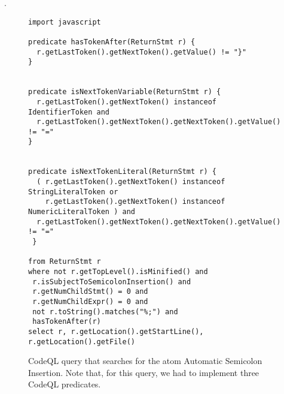 .

\begin{figure}[htb]
\begin{lstlisting}[language=CodeQL, basicstyle=\scriptsize]
import javascript

predicate hasTokenAfter(ReturnStmt r) {
  r.getLastToken().getNextToken().getValue() != "}"
}


predicate isNextTokenVariable(ReturnStmt r) {
  r.getLastToken().getNextToken() instanceof IdentifierToken and 
  r.getLastToken().getNextToken().getNextToken().getValue() != "="
}


predicate isNextTokenLiteral(ReturnStmt r) {
  ( r.getLastToken().getNextToken() instanceof StringLiteralToken or
    r.getLastToken().getNextToken() instanceof NumericLiteralToken ) and 
  r.getLastToken().getNextToken().getNextToken().getValue() != "="
 }

from ReturnStmt r
where not r.getTopLevel().isMinified() and
 r.isSubjectToSemicolonInsertion() and 
 r.getNumChildStmt() = 0 and
 r.getNumChildExpr() = 0 and
 not r.toString().matches("%;") and
 hasTokenAfter(r) 
select r, r.getLocation().getStartLine(), r.getLocation().getFile()
\end{lstlisting}
  \caption{CodeQL query that searches for the atom Automatic Semicolon Insertion. Note that, for this query,
    we had to implement three CodeQL predicates.}
  \label{lst:codeql-automatic}
\end{figure}


